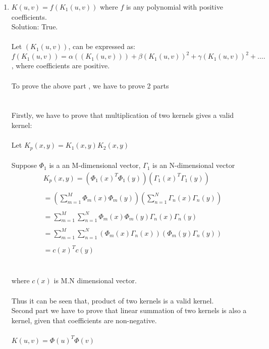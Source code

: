 \documentclass[twoside,11pt]{article}\usepackage{amsmath,amsfonts,amsthm,fullpage}
\begin{document}
\begin{enumerate}
\item $K(u,v) = f(K_1(u,v))$ where $f$ is any polynomial with positive coefficients.
\\ Solution: True.
\\\\ Let $(K_1(u,v))$, can be expressed as:
\begin{equation} \nonumber
f(K_1(u,v)) = \alpha((K_1(u,v))) + \beta{(K_1(u,v))}^2 +\gamma {(K_1(u,v))}^2  + ....
\end{equation}, where coefficients are positive. \\
\\To prove the above part , we have to prove 2 parts \\
\\\\ Firstly, we have to prove that multiplication of two kernels gives a valid kernel: \\\\
Let $ K_p (x,y) = K_1(x,y) K_2(x,y) $
\\\\ Suppose $\Phi_1$ is a an M-dimensional vector, $ \Gamma_1$ is an N-dimensional vector
\begin{equation} \nonumber
\begin{split}
 K_p (x,y)= ({\Phi_1(x)}^T{\Phi_1(y)})({\Gamma_1(x)}^T{\Gamma_1(y)}) \\\\
= (\sum_{m=1}^M \Phi_m(x)\Phi_m(y))(\sum_{n=1}^{N} \Gamma_n(x)\Gamma_n(y))\\\\
= \sum_{m=1}^M \sum_{n=1}^N \Phi_m(x)\Phi_m(y) \Gamma_n(x)\Gamma_n(y)\\\\
= \sum_{m=1}^M \sum_{n=1}^N (\Phi_m(x)\Gamma_n(x))(\Phi_m(y)\Gamma_n(y)) \\\\
= c(x)^T c(y) 
\end{split}
\end{equation}
\\\\ where $c(x)$ is M.N dimensional vector.
\\\\ Thus it can be seen that, product of two kernels is a valid kernel.  \\[.25cm]
Second part we have to prove  that linear summation of two kernels is also a kernel, given that coefficients are non-negative.\\
\\ $ K(u,v) = {\Phi(u)}^T{\Phi(v)}$

\end{enumerate}
\end{document}
